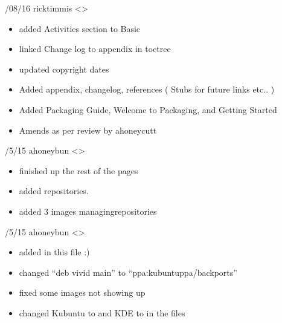 \documentclass[letterpaper,10pt,english]{sphinxmanual}
\begin{document}
/08/16 \sphinxhyphen{} ricktimmis \textless{}\textgreater{}
\begin{itemize}
\item {} 
\sphinxAtStartPar
added Activities section to Basic

\item {} 
\sphinxAtStartPar
linked Change log to appendix in toctree

\item {} 
\sphinxAtStartPar
updated copyright dates

\item {} 
\sphinxAtStartPar
Added appendix, changelog, references ( Stubs for future links etc.. )

\item {} 
\sphinxAtStartPar
Added Packaging Guide, Welcome to Packaging, and Getting Started

\item {} 
\sphinxAtStartPar
Amends as per review by ahoneycutt

\end{itemize}

/5/15 \sphinxhyphen{} ahoneybun \textless{}\textgreater{}
\begin{itemize}
\item {} 
\sphinxAtStartPar
finished up the rest of the pages

\item {} 
\sphinxAtStartPar
added repositories.

\item {} 
\sphinxAtStartPar
added 3 images managing\sphinxhyphen{}repositories

\end{itemize}

/5/15 \sphinxhyphen{} ahoneybun \textless{}\textgreater{}
\begin{itemize}
\item {} 
\sphinxAtStartPar
added in this file :)

\item {} 
\sphinxAtStartPar
changed “deb  vivid main” to “ppa:kubuntu\sphinxhyphen{}ppa/backports”

\item {} 
\sphinxAtStartPar
fixed some images not showing up

\item {} 
\sphinxAtStartPar
changed Kubuntu to  and KDE to  in the files

\end{itemize}
\end{document}
